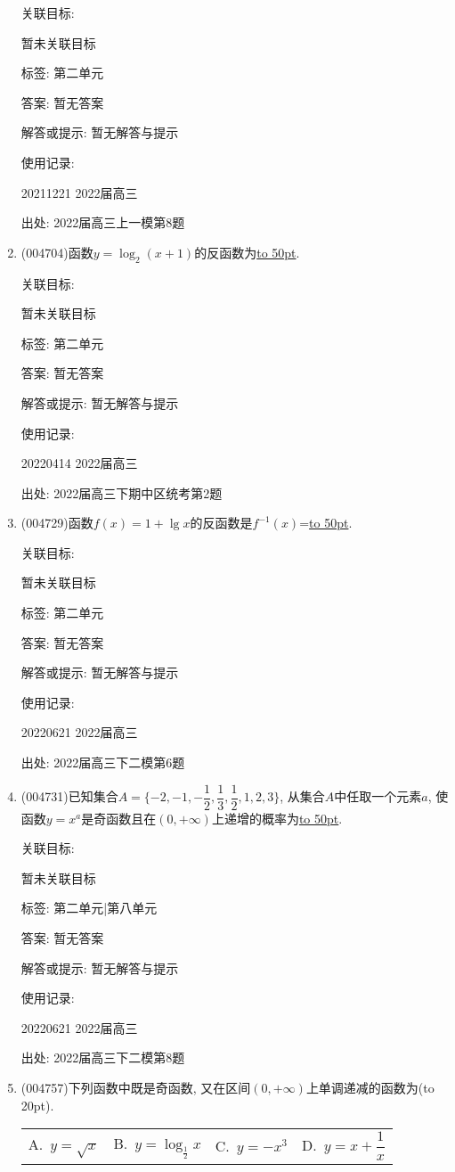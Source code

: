 \documentclass[10pt,a4paper]{article}
\newcommand{\blank}[1]{\underline{\hbox to #1pt{}}}
\newcommand{\bracket}[1]{(\hbox to #1pt{})}
\newcommand{\fourch}[4]{\par\begin{tabular}{p{.23\textwidth}p{.23\textwidth}p{.23\textwidth}p{.23\textwidth}}
A.~#1 &B.~#2& C.~#3& D.~#4
\end{tabular}}
\begin{document}
\begin{enumerate}[1.]
关联目标:

暂未关联目标



标签: 第二单元

答案: 暂无答案

解答或提示: 暂无解答与提示

使用记录:

20211221	2022届高三	


出处: 2022届高三上一模第8题
\item { (004704)}函数$y=\log_2(x+1)$的反函数为\blank{50}.


关联目标:

暂未关联目标



标签: 第二单元

答案: 暂无答案

解答或提示: 暂无解答与提示

使用记录:

20220414	2022届高三	


出处: 2022届高三下期中区统考第2题
\item { (004729)}函数$f(x)=1+\lg x$的反函数是$f^{-1}(x)$=\blank{50}.


关联目标:

暂未关联目标



标签: 第二单元

答案: 暂无答案

解答或提示: 暂无解答与提示

使用记录:

20220621	2022届高三	


出处: 2022届高三下二模第6题
\item { (004731)}已知集合$A=\{-2,-1,-\dfrac 12,\dfrac 13,\dfrac 12,1,2,3\}$, 从集合$A$中任取一个元素$a$, 使函数$y=x^a$是奇函数且在$(0,+\infty)$上递增的概率为\blank{50}.


关联目标:

暂未关联目标



标签: 第二单元|第八单元

答案: 暂无答案

解答或提示: 暂无解答与提示

使用记录:

20220621	2022届高三	


出处: 2022届高三下二模第8题
\item { (004757)}下列函数中既是奇函数, 又在区间$(0,+\infty)$上单调递减的函数为\bracket{20}.
\fourch{$y=\sqrt x$}{$y=\log_{\frac 12}x$}{$y=-x^3$}{$y=x+\dfrac 1x$}



\end{enumerate}
\end{document}
